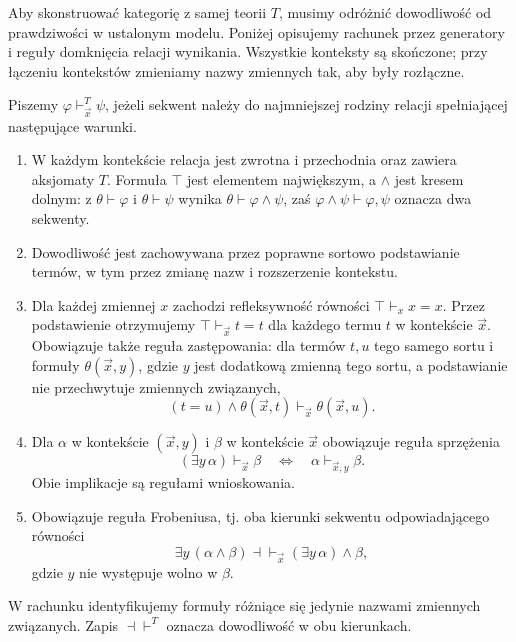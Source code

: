 Aby skonstruować kategorię z samej teorii $T$, musimy odróżnić dowodliwość od prawdziwości w ustalonym modelu. Poniżej opisujemy rachunek przez generatory i reguły domknięcia relacji wynikania. Wszystkie konteksty są skończone; przy łączeniu kontekstów zmieniamy nazwy zmiennych tak, aby były rozłączne.

\begin{definicja}\label{cat:def:cl-regular-deduction}
Piszemy $\varphi\vdash^T_{\vec x}\psi$, jeżeli sekwent należy do najmniejszej rodziny relacji spełniającej następujące warunki.
\begin{enumerate}
 \item W każdym kontekście relacja jest zwrotna i przechodnia oraz zawiera aksjomaty $T$. Formuła $\top$ jest elementem największym, a $\wedge$ jest kresem dolnym: z $\theta\vdash\varphi$ i $\theta\vdash\psi$ wynika $\theta\vdash\varphi\wedge\psi$, zaś $\varphi\wedge\psi\vdash\varphi,\psi$ oznacza dwa sekwenty.
 \item Dowodliwość jest zachowywana przez poprawne sortowo podstawianie termów, w tym przez zmianę nazw i rozszerzenie kontekstu.
 \item Dla każdej zmiennej $x$ zachodzi refleksywność równości $\top\vdash_x x=x$. Przez podstawienie otrzymujemy $\top\vdash_{\vec x}t=t$ dla każdego termu $t$ w kontekście $\vec x$. Obowiązuje także reguła zastępowania: dla termów $t,u$ tego samego sortu i formuły $\theta(\vec x,y)$, gdzie $y$ jest dodatkową zmienną tego sortu, a podstawianie nie przechwytuje zmiennych związanych,
 \[
 (t=u)\wedge\theta(\vec x,t)\vdash_{\vec x}\theta(\vec x,u).
 \]
 \item Dla $\alpha$ w kontekście $(\vec x,y)$ i $\beta$ w kontekście $\vec x$ obowiązuje reguła sprzężenia
 \[
 (\exists y\,\alpha)\vdash_{\vec x}\beta
 \quad\Longleftrightarrow\quad
 \alpha\vdash_{\vec x,y}\beta.
 \]
 Obie implikacje są regułami wnioskowania.
 \item Obowiązuje reguła Frobeniusa, tj. oba kierunki sekwentu odpowiadającego równości
 \[
 \exists y\,(\alpha\wedge\beta)
 \dashv\vdash_{\vec x}(\exists y\,\alpha)\wedge\beta,
 \]
 gdzie $y$ nie występuje wolno w $\beta$.
\end{enumerate}
W rachunku identyfikujemy formuły różniące się jedynie nazwami zmiennych związanych. Zapis $\dashv\vdash^T$ oznacza dowodliwość w obu kierunkach.
\end{definicja}

